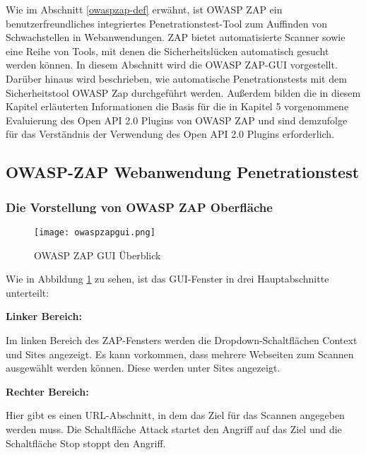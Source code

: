 Wie im Abschnitt \ref{owaspzap-def} erwähnt, ist OWASP ZAP ein benutzerfreundliches integriertes Penetrationstest-Tool zum Auffinden von Schwachstellen in Webanwendungen. ZAP bietet automatisierte Scanner sowie eine Reihe von Tools, mit denen die Sicherheitslücken automatisch gesucht werden können. In diesem Abschnitt wird die OWASP ZAP-GUI vorgestellt. Darüber hinaus wird beschrieben, wie automatische Penetrationstests mit dem Sicherheitstool OWASP Zap durchgeführt werden. Außerdem bilden die in diesem Kapitel erläuterten Informationen die Basis für die in Kapitel 5 vorgenommene Evaluierung des Open API 2.0 Plugins von OWASP ZAP und sind demzufolge für das Verständnis der Verwendung des Open API 2.0 Plugins erforderlich.

\subsection{OWASP-ZAP Webanwendung Penetrationstest}

\subsubsection{Die Vorstellung von OWASP ZAP Oberfläche}

\newpage

\begin{figure}[h]
	\centering
	\texttt{[image: owaspzapgui.png]}
	\caption{OWASP ZAP GUI Überblick}
	\label{owaspguiabbildung}
\end{figure}

Wie in Abbildung \ref{owaspguiabbildung} zu sehen, ist das GUI-Fenster in drei Hauptabschnitte unterteilt:\\

\begin{flushleft}
	\textbf{Linker Bereich:}\\
\end{flushleft}
Im linken Bereich des ZAP-Fensters werden die Dropdown-Schaltflächen Context und Sites angezeigt. Es kann vorkommen, dass mehrere Webseiten zum Scannen ausgewählt werden können. Diese werden unter Sites angezeigt.

\begin{flushleft}
	\textbf{Rechter Bereich:}\\
\end{flushleft}
Hier gibt es einen URL-Abschnitt, in dem das Ziel für das Scannen angegeben werden muss. Die Schaltfläche Attack startet den Angriff auf das Ziel und die Schaltfläche Stop stoppt den Angriff.

